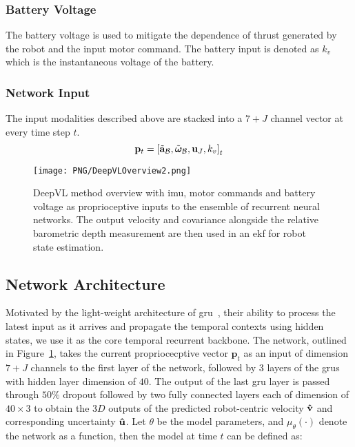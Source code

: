 \subsubsection{Battery Voltage}
The battery voltage is used to mitigate the dependence of thrust generated by the robot and the input motor command. The battery input is denoted as $k_{v}$ which is the instantaneous voltage of the battery.
\subsubsection{Network Input}
The input modalities described above are stacked into a $7+J$ channel vector at every time step $t$.
\begin{equation}
\mathbf{p}_{t}=\left[\tilde{\mathbf{a}}_{\mathcal{B}},\tilde{\boldsymbol{\omega}}_{\mathcal{B}}, \mathbf{u}_{J}, k_{v}\right]_{t}
\end{equation}

\begin{figure}
    \centering
    \texttt{[image: PNG/DeepVLOverview2.png]}
    \caption{DeepVL method overview with \ac{imu}, motor commands and battery voltage as proprioceptive inputs to the ensemble of recurrent neural networks. The output velocity and covariance alongside the relative barometric depth measurement are then used in an \ac{ekf} for robot state estimation.}
    \label{fig:deepvlarchitecture}
\end{figure}


\subsection{Network Architecture} Motivated by the light-weight architecture of \ac{gru}~\cite{cho-etal-2014-learning}, their ability to process the latest input as it arrives and propagate the temporal contexts using hidden states, we use it as the core temporal recurrent backbone. The network, outlined in Figure~\ref{fig:deepvlarchitecture},
takes the current propriocecptive vector $\mathbf{p}_{t}$ as an input of dimension $7+J$ channels to the first layer of the network, followed by 3 layers of the \acp{gru} with hidden layer dimension of $40$. The output of the last \ac{gru} layer is passed through $50\%$ dropout followed by two fully connected layers each of dimension of $40\times3$ to obtain the $3D$ outputs of the predicted robot-centric velocity $\mathbf{\hat{v}}$ and corresponding uncertainty $\mathbf{\hat{u}}$. Let $\theta$ be the model parameters, and $\mu_{\theta}(\cdot)$ denote the network as a function, then the model at time $t$ can be defined as:

